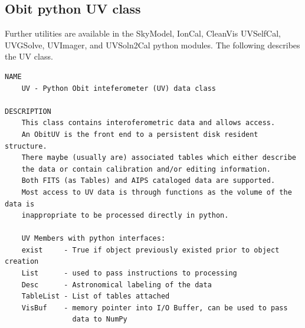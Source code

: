 \documentclass[11pt]{report}
\begin{document}
\subsection{Obit python UV class}
Further utilities are available in the SkyModel, IonCal, CleanVis
UVSelfCal, UVGSolve, UVImager, and UVSoln2Cal python modules. 
The following describes the UV class.
\begin{verbatim}
NAME
    UV - Python Obit inteferometer (UV) data class

DESCRIPTION
    This class contains interoferometric data and allows access.
    An ObitUV is the front end to a persistent disk resident structure.
    There maybe (usually are) associated tables which either describe
    the data or contain calibration and/or editing information.
    Both FITS (as Tables) and AIPS cataloged data are supported.
    Most access to UV data is through functions as the volume of the data is
    inappropriate to be processed directly in python.
    
    UV Members with python interfaces:
    exist     - True if object previously existed prior to object creation
    List      - used to pass instructions to processing
    Desc      - Astronomical labeling of the data
    TableList - List of tables attached
    VisBuf    - memory pointer into I/O Buffer, can be used to pass
                data to NumPy


\end{verbatim}
\end{document}
